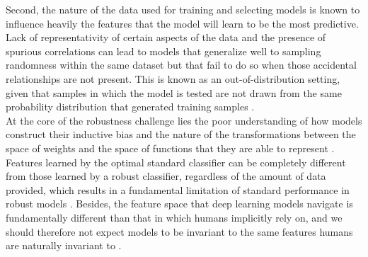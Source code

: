 Second, the nature of the data used for training and selecting
models is known to influence heavily the features that the model 
will learn to be the most predictive. Lack of representativity of 
certain aspects of the data and the presence of spurious 
correlations can lead to models that generalize well to sampling 
randomness within the same dataset but that fail to do so when those 
accidental relationships are not present. This is known as an
out-of-distribution setting, given that samples in which the model is tested
are not drawn from the same probability distribution that generated
training samples \cite{quinonero-candelaDatasetShiftMachine2009}. \\

At the core of the robustness challenge lies the poor
understanding of how models construct their inductive bias and the nature
of the transformations between the space of weights and the space of 
functions that they are able to represent \cite{jimenezInductiveBiasDeep}. 
Features learned by the optimal standard classifier can be completely 
different from those learned by a robust classifier, regardless 
of the amount of data provided, which results in a fundamental limitation of standard performance
in robust models \cite{tsiprasRobustnessMayBe2019,zhangTheoreticallyPrincipledTradeoff2019}.
Besides, the feature space that deep learning models navigate is fundamentally 
different than that in which humans implicitly rely on, and we 
should therefore not expect models to be invariant to the 
same features humans are naturally invariant to \cite{ilyasAdversarialExamplesAre2019}. \\

